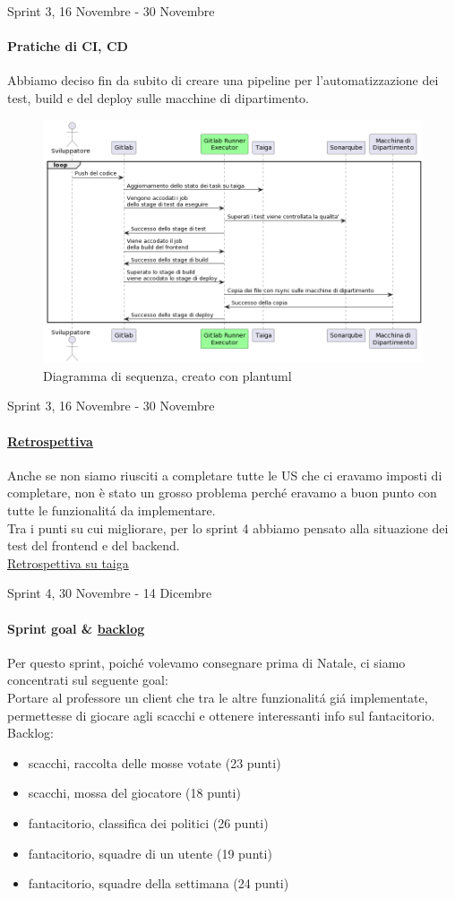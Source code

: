 \documentclass[12pt, aspectration=169]{beamer}
\begin{document}
\begin{frame}{Sprint 3, 16 Novembre - 30 Novembre}
\framesubtitle{Pratiche di CI, CD}
Abbiamo deciso fin da subito di creare una pipeline per l'automatizzazione dei test, build e del deploy sulle macchine di dipartimento.
\begin{figure}[H]
    \centering
    \includegraphics[scale=0.18]{misc/cicd.png}
    \caption{Diagramma di sequenza, creato con plantuml}
    \label{fig:pipeline}
\end{figure}
\end{frame}
\begin{frame}{Sprint 3, 16 Novembre - 30 Novembre}
\framesubtitle{\href{https://taiga.hjkl.gq/project/ingsw2022-team3/wiki/retrospettiva-sprint-3}{Retrospettiva}}
Anche se non siamo riusciti a completare tutte le US che ci eravamo imposti di completare, non \`e stato un grosso problema perch\'e eravamo a buon punto con tutte le funzionalit\'a da implementare.\\
Tra i punti su cui migliorare, per lo sprint 4 abbiamo pensato alla situazione dei test del frontend e del backend. \\
\href{https://taiga.hjkl.gq/project/ingsw2022-team3/wiki/retrospettiva-sprint-4}{Retrospettiva su taiga}
\end{frame}
\begin{frame}{Sprint 4, 30 Novembre - 14 Dicembre}
\framesubtitle{Sprint goal \& \href{https://taiga.hjkl.gq/project/ingsw2022-team3/taskboard/sprint-4-5}{backlog}}
Per questo sprint, poich\'e volevamo consegnare prima di Natale, ci siamo concentrati sul seguente goal: \\
Portare al professore un client che tra le altre funzionalit\'a gi\'a implementate, permettesse di giocare agli scacchi e ottenere interessanti info sul fantacitorio. \\
Backlog:
\begin{itemize}
    \item scacchi, raccolta delle mosse votate (23 punti)
    \item scacchi, mossa del giocatore (18 punti)
    \item fantacitorio, classifica dei politici (26 punti)
    \item fantacitorio, squadre di un utente (19 punti)
    \item fantacitorio, squadre della settimana (24 punti)
\end{itemize}
\end{frame}
\end{document}
